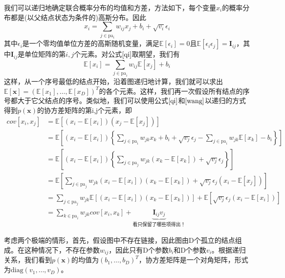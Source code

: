 我们可以递归地确定联合概率分布的均值和方差，方法如下，每个变量$x_i$的概率分布都是(以父结点状态为条件的)高斯分布。因此
\begin{equation}
\label{qi}
	x_i=\sum_{j\in \textrm{pa}_i}w_{ij}x_j+b_i+\sqrt{v_i}\epsilon_i
\end{equation}
其中$\epsilon_i$是一个零均值单位方差的高斯随机变量，满足$\mathbb{E}[\epsilon_i]=0$且$\mathbb{E}[\epsilon_i\epsilon_j]=\boldsymbol{I}_{ij}$，其中$\boldsymbol{I}_{ij}$是单位矩阵的第$i,j$个元素。对公式$\ref{qi}$取期望，我们有
\begin{equation}
\label{wang}
	\mathbb{E}[x_i]=\sum_{j\in \textrm{pa}_i}w_{ij}\mathbb{E}[x_j]+b_i
\end{equation}
这样，从一个序号最低的结点开始，沿着图递归地计算，我们就可以求出$\mathbb{E}[\boldsymbol{x}]=(\mathbb{E}[x_1],\dots,\mathbb{E}[x_D])^T$的各个元素。这样，我们再一次假设所有结点的序号都大于它父结点的序号。类似地，我们可以使用公式$\ref{qi}$和$\ref{wang}$以递归的方式得到$p(\boldsymbol{x})$的协方差矩阵的第i,j个元素，即
\begin{equation}
\begin{aligned}
	cov[x_i,x_j]&=\mathbb{E}[(x_i-\mathbb{E}[x_i])(x_j-\mathbb{E}[x_j])]\\
	&=\mathbb{E}\left[(x_i-\mathbb{E}[x_i])\left\{\sum_{j\in \textrm{pa}_i}w_{jk}x_k+b_i+\sqrt{v_j}\epsilon_j-\sum_{j\in \textrm{pa}_i}w_{jk}\mathbb{E}[x_k]-b_i\right\} \right]\\
	&=\mathbb{E}\left[(x_i-\mathbb{E}[x_i])\left\{\sum_{j\in \textrm{pa}_j}w_{jk}(x_k-\mathbb{E}[x_k])+\sqrt{v_j}\epsilon_j \right\} \right]\\
	&=\mathbb{E}\left[\sum_{j\in \textrm{pa}_j}w_{jk}(x_i-\mathbb{E}[x_i])(x_k-\mathbb{E}[x_k])+\sqrt{v_j}\epsilon_j(x_i-\mathbb{E}[x_j])  \right]\\
	&=\sum_{j\in \textrm{pa}_j}w_{jk}\mathbb{E}[(x_i-\mathbb{E}[x_i])(x_k-\mathbb{E}[x_k])]+\mathbb{E}[\sqrt{v_j}\epsilon_j(x_i-\mathbb{E}[x_i])]\\
	&=\sum_{k\in \textrm{pa}_i}w_{jk}cov[x_i,x_k]+\underbrace{\boldsymbol{I}_{ij}v_j}_{\text{看只保留了哪些项得出！}}
\end{aligned}
\end{equation}

考虑两个极端的情形，首先，假设图中不存在链接，因此图由D个孤立的结点组成。在这种情况下，不存在参数$w_{ij}$，因此只有D个参数$b_i$和D个参数$v_i$。根据递归关系，我们看到$p(\boldsymbol{x})$的均值为$(b_1,\dots,b_D)^T$，协方差矩阵是一个对角矩阵，形式为$\textrm{diag}(v_1,\dots,v_D)$。

